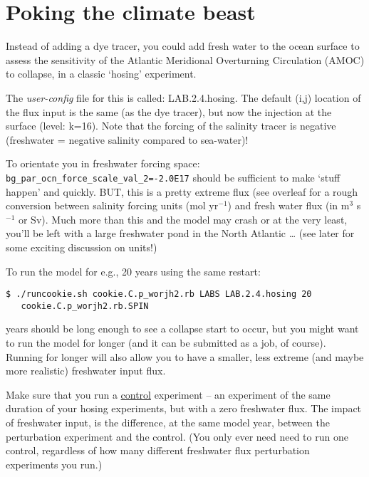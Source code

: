 \newpage

\section{Poking the climate beast}

Instead of adding a dye tracer, you could add fresh water to the ocean surface to assess the sensitivity of the Atlantic Meridional Overturning Circulation (AMOC) to collapse, in a classic ‘hosing’ experiment.

The \textit{user-config} file for this is called: \textsf{\footnotesize LAB.2.4.hosing}. The default (i,j) location of the flux input is the same (as the dye tracer), but now the injection at the surface (level: k=16). Note that the forcing of the salinity tracer is negative (freshwater = negative salinity compared to sea-water)!

To orientate you in freshwater forcing space: \texttt{bg\_par\_ocn\_force\_scale\_val\_2=-2.0E17} should be sufficient to make ‘stuff happen’ and quickly. BUT, this is a pretty extreme flux (see overleaf for a rough conversion between salinity forcing units (mol yr$^{-1}$) and fresh water flux (in m$^{3}$ s$^{-1}$ or Sv). Much more than this and the model may crash or at the very least, you’ll be left with a large freshwater pond in the North Atlantic … (see later for some exciting discussion on units!)

\vspace{1mm}
To run the model for e.g., 20 years using the same restart:

\vspace{-2mm}\small\begin{verbatim}
$ ./runcookie.sh cookie.C.p_worjh2.rb LABS LAB.2.4.hosing 20 
   cookie.C.p_worjh2.rb.SPIN
\end{verbatim}\normalsize\vspace{-2mm}

 years should be long enough to see a collapse start to occur, but you might want to run the model for longer (and it can be submitted as a job, of course). Running for longer will also allow you to have a smaller, less extreme (and maybe more realistic) freshwater input flux.

Make sure that you run a \uline{control} experiment -- an experiment of the same duration of your hosing experiments, but with a zero freshwater flux. The impact of freshwater input, is the difference, at the same model year, between the perturbation experiment and the control. (You only ever need need to run one control, regardless of how many different freshwater flux perturbation experiments  you run.) 


